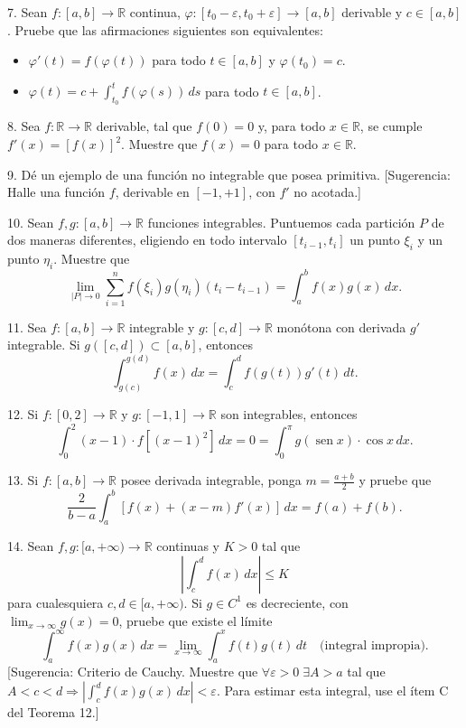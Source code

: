 \documentclass[12pt,oneside]{book}
\begin{document}
7. Sean \(f: [a, b] \to \mathbb{R}\) continua, \(\varphi: [t_0 - \varepsilon, t_0 + \varepsilon] \to [a, b]\) derivable y \(c \in [a, b]\). Pruebe que las afirmaciones siguientes son equivalentes:
\begin{itemize}
    \item[A.] \(\varphi'(t) = f(\varphi(t))\) para todo \(t \in [a, b]\) y \(\varphi(t_0) = c\).

    \item[B.] \(\varphi(t) = c + \int_{t_0}^{t} f(\varphi(s)) \, ds\) para todo \(t \in [a, b]\).
\end{itemize}

8. Sea \(f: \mathbb{R} \to \mathbb{R}\) derivable, tal que \(f(0) = 0\) y, para todo \(x \in \mathbb{R}\), se cumple \(f'(x) = [f(x)]^2\). Muestre que \(f(x) = 0\) para todo \(x \in \mathbb{R}\).

9. Dé un ejemplo de una función no integrable que posea primitiva. [Sugerencia: Halle una función \(f\), derivable en \([-1, +1]\), con \(f'\) no acotada.]

10. Sean \(f, g: [a, b] \to \mathbb{R}\) funciones integrables. Puntuemos cada partición \(P\) de dos maneras diferentes, eligiendo en todo intervalo \([t_{i-1}, t_i]\) un punto \(\xi_i\) y un punto \(\eta_i\). Muestre que
\[
\lim_{|P| \to 0} \sum_{i=1}^n f(\xi_i) g(\eta_i)(t_i - t_{i-1}) = \int_a^b f(x) g(x) \, dx.
\]

11. Sea \(f: [a, b] \to \mathbb{R}\) integrable y \(g: [c, d] \to \mathbb{R}\) monótona con derivada \(g'\) integrable. Si
\(g([c, d]) \subset [a, b]\), entonces
\[
\int_{g(c)}^{g(d)} f(x) \, dx = \int_c^d f(g(t)) g'(t) \, dt.
\]

12. Si \(f: [0, 2] \to \mathbb{R}\) y \(g: [-1, 1] \to \mathbb{R}\) son integrables, entonces
\[
\int_0^2 (x - 1) \cdot f[(x - 1)^2] \, dx = 0 = \int_0^{\pi} g(\operatorname{sen} x) \cdot \cos x \, dx.
\]

13. Si \(f: [a, b] \to \mathbb{R}\) posee derivada integrable, ponga \(m = \frac{a + b}{2}\) y pruebe que
\[
\frac{2}{b-a} \int_a^b [f(x) + (x - m)f'(x)] \, dx = f(a) + f(b).
\]

14. Sean \(f, g: [a, +\infty) \to \mathbb{R}\) continuas y \(K > 0\) tal que
\[
\left| \int_c^d f(x) \, dx \right| \leq K
\]
para cualesquiera \(c, d \in [a, +\infty)\). Si \(g \in C^1\) es decreciente, con \(\lim_{x \to \infty} g(x) = 0\), pruebe que existe el límite
\[
\int_a^\infty f(x)g(x) \, dx = \lim_{x \to \infty} \int_a^x f(t)g(t) \, dt \quad \text{(integral impropia)}.
\]
[Sugerencia: Criterio de Cauchy. Muestre que \(\forall \varepsilon > 0 \; \exists A > a\) tal que \(A < c < d \Rightarrow \left| \int_c^d f(x)g(x) \, dx \right| < \varepsilon\). Para estimar esta integral, use el ítem C del Teorema 12.]
\end{document}
